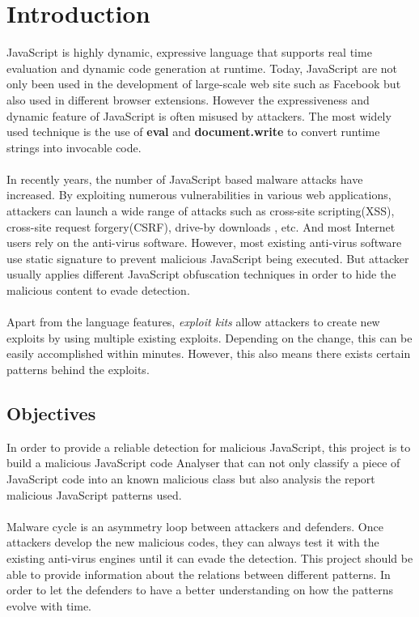 \chapter{Introduction}
JavaScript is highly dynamic, expressive language that supports real time evaluation and dynamic code generation at runtime. Today, JavaScript are not only been used in the development of large-scale web site such as Facebook but also used in different browser extensions. However the expressiveness and dynamic feature of JavaScript is often misused by attackers. The most widely used technique is the use of \textbf{eval} and \textbf{document.write} to convert runtime strings into invocable code. \\ \\
In recently years, the number of JavaScript based malware attacks have increased. By exploiting numerous vulnerabilities in various web applications, attackers can launch a wide range of at­tacks such as cross-site scripting(XSS)\cite{XSS}, cross-site request forgery(CSRF)\cite{CSRF}, drive-by downloads \cite{Drive-by Downloads}, etc. And most Internet users rely on the anti-virus software. However,  most existing anti-virus software use static signature to prevent malicious JavaScript being executed. But attacker usually applies different JavaScript obfuscation techniques in order to hide the malicious content to evade detection. \\ \\
Apart from the language features, \textit{exploit kits}\cite{EK} allow attackers to create new exploits by using multiple existing exploits. Depending on the change, this can be easily accomplished within minutes. However, this also means there exists certain patterns behind the exploits. 
\section{Objectives}
In order to provide a reliable detection for malicious JavaScript, this project is to build a malicious JavaScript code Analyser that can not only classify a piece of JavaScript code into an known malicious class but also analysis the report malicious JavaScript patterns used. \\ \\
Malware cycle is an asymmetry loop between attackers and defenders. Once attackers develop the new malicious codes, they can always test it with the existing anti-virus engines until it can evade the detection. This project should be able to provide information about the relations between different patterns. In order to let the defenders to have a better understanding on how the patterns evolve with time. 
